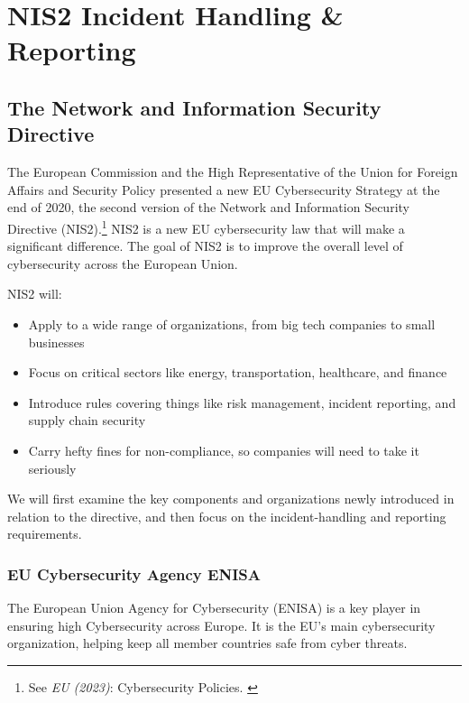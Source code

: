 %
%

\pagebreak
\section{NIS2 Incident Handling \& Reporting}

\onehalfspacing

\subsection{The Network and Information Security Directive}

The European Commission and the High Representative of the Union for Foreign Affairs and Security Policy presented a new EU Cybersecurity Strategy at the end of 2020, the second version of the Network and Information Security Directive (NIS2).\footnote{See \textit{EU (2023)}: Cybersecurity Policies. \cite{cyberPol}} NIS2 is a new EU cybersecurity law that will make a significant difference. The goal of NIS2 is to improve the overall level of cybersecurity across the European Union.

NIS2 will:

\begin{itemize}
    \item Apply to a wide range of organizations, from big tech companies to small businesses
    \item Focus on critical sectors like energy, transportation, healthcare, and finance
    \item Introduce rules covering things like risk management, incident reporting, and supply chain security
    \item Carry hefty fines for non-compliance, so companies will need to take it seriously
\end{itemize}

We will first examine the key components and organizations newly introduced in relation to the directive, and then focus on the incident-handling and reporting requirements.

\subsubsection{EU Cybersecurity Agency ENISA}

The European Union Agency for Cybersecurity (ENISA) is a key player in ensuring high Cybersecurity across Europe. It is the EU's main cybersecurity organization, helping keep all member countries safe from cyber threats.

